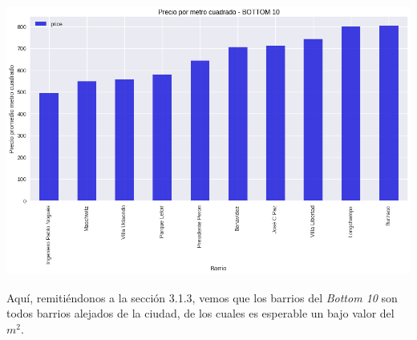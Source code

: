 \documentclass[a4paper, 10pt]{article}
\newcommand\tab[1][0.5cm]{\hspace*{#1}}
\begin{document}
				\begin{center}
   	    				\includegraphics[width=7in, height=3.5in]{images/m2Bottom10}
			  	\end{center}
				\tab Aquí, remitiéndonos a la sección 3.1.3, vemos que los barrios del \emph{Bottom 10} son todos barrios
				alejados de la ciudad, de los cuales es esperable un bajo valor del $m^2$.
\end{document}
